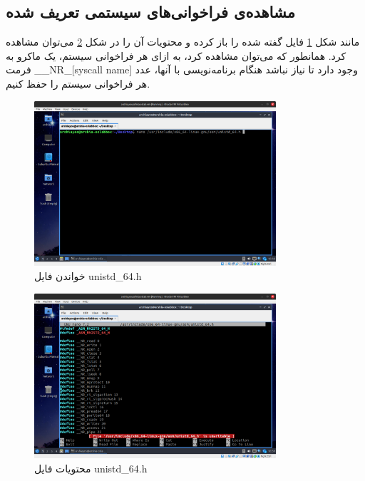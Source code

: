\documentclass[12pt]{article}
\begin{document}
        \subsection{مشاهده‌ی فراخوانی‌های سیستمی تعریف شده}
        مانند شکل 
        \ref{im1}
        فایل گفته شده را باز کرده و محتویات آن را در شکل
        \ref{im2}
        می‌توان مشاهده کرد. همانطور که می‌توان مشاهده کرد، به ازای هر فراخوانی سیستم، یک ماکرو به فرمت
        \textenglish{\_\_NR\_[syscall name]}
        وجود دارد تا نیاز نباشد هنگام برنامه‌نویسی با آنها، عدد هر فراخوانی سیستم را حفظ کنیم.

        \begin{figure}[H]
		\centering
		\includegraphics[width=0.8\textwidth]{report2-resources/1.png}
		\caption{خواندن فایل \textenglish{unistd\_64.h}}
            \label{im1}
	\end{figure}

        \begin{figure}[H]
		\centering
		\includegraphics[width=0.8\textwidth]{report2-resources/2.png}
		\caption{محتویات فایل \textenglish{unistd\_64.h}}
            \label{im2}
	\end{figure}
\end{document}
